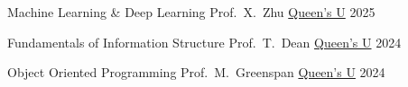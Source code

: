 \begin{cvhonors}

  \cvhonor
    {Machine Learning \& Deep Learning} %
    {\taprefix Prof.~X.~Zhu} %
    {\href{https://www.queensu.ca/}{Queen's U}} %
    {2025} %

  \cvhonor
    {Fundamentals of Information Structure} %
    {\taprefix Prof.~T.~Dean} %
    {\href{https://www.queensu.ca/}{Queen's U}} %
    {2024} %

  \cvhonor
    {Object Oriented Programming} %
    {\taprefix Prof.~M.~Greenspan} %
    {\href{https://www.queensu.ca/}{Queen's U}} %
    {2024} %








\end{cvhonors}
